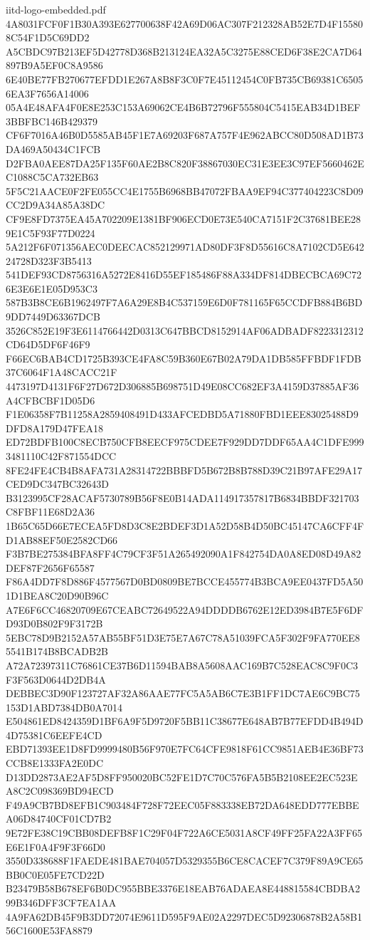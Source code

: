 \begin{filecontents*}[overwrite]{iitd-logo-embedded.pdf}
4A8031FCF0F1B30A393E627700638F42A69D06AC307F212328AB52E7D4F155808C54F1D5C69DD2
A5CBDC97B213EF5D42778D368B213124EA32A5C3275E88CED6F38E2CA7D64897B9A5EF0C8A9586
6E40BE77FB270677EFDD1E267A8B8F3C0F7E45112454C0FB735CB69381C65056EA3F7656A14006
05A4E48AFA4F0E8E253C153A69062CE4B6B72796F555804C5415EAB34D1BEF3BBFBC146B429379
CF6F7016A46B0D5585AB45F1E7A69203F687A757F4E962ABCC80D508AD1B73DA469A50434C1FCB
D2FBA0AEE87DA25F135F60AE2B8C820F38867030EC31E3EE3C97EF5660462EC1088C5CA732EB63
5F5C21AACE0F2FE055CC4E1755B6968BB47072FBAA9EF94C377404223C8D09CC2D9A34A85A38DC
CF9E8FD7375EA45A702209E1381BF906ECD0E73E540CA7151F2C37681BEE289E1C5F93F77D0224
5A212F6F071356AEC0DEECAC852129971AD80DF3F8D55616C8A7102CD5E64224728D323F3B5413
541DEF93CD8756316A5272E8416D55EF185486F88A334DF814DBECBCA69C726E3E6E1E05D953C3
587B3B8CE6B1962497F7A6A29E8B4C537159E6D0F781165F65CCDFB884B6BD9DD7449D63367DCB
3526C852E19F3E6114766442D0313C647BBCD8152914AF06ADBADF8223312312CD64D5DF6F46F9
F66EC6BAB4CD1725B393CE4FA8C59B360E67B02A79DA1DB585FFBDF1FDB37C6064F1A48CACC21F
4473197D4131F6F27D672D306885B698751D49E08CC682EF3A4159D37885AF36A4CFBCBF1D05D6
F1E06358F7B11258A2859408491D433AFCEDBD5A71880FBD1EEE83025488D9DFD8A179D47FEA18
ED72BDFB100C8ECB750CFB8EECF975CDEE7F929DD7DDF65AA4C1DFE9993481110C42F871554DCC
8FE24FE4CB4B8AFA731A28314722BBBFD5B672B8B788D39C21B97AFE29A17CED9DC347BC32643D
B3123995CF28ACAF5730789B56F8E0B14ADA114917357817B6834BBDF321703C8FBF11E68D2A36
1B65C65D66E7ECEA5FD8D3C8E2BDEF3D1A52D58B4D50BC45147CA6CFF4FD1AB88EF50E2582CD66
F3B7BE275384BFA8FF4C79CF3F51A265492090A1F842754DA0A8ED08D49A82DEF87F2656F65587
F86A4DD7F8D886F4577567D0BD0809BE7BCCE455774B3BCA9EE0437FD5A501D1BEA8C20D90B96C
A7E6F6CC46820709E67CEABC72649522A94DDDDB6762E12ED3984B7E5F6DFD93D0B802F9F3172B
5EBC78D9B2152A57AB55BF51D3E75E7A67C78A51039FCA5F302F9FA770EE85541B174B8BCADB2B
A72A72397311C76861CE37B6D11594BAB8A5608AAC169B7C528EAC8C9F0C3F3F563D0644D2DB4A
DEBBEC3D90F123727AF32A86AAE77FC5A5AB6C7E3B1FF1DC7AE6C9BC75153D1ABD7384DB0A7014
E504861ED8424359D1BF6A9F5D9720F5BB11C38677E648AB7B77EFDD4B494D4D75381C6EEFE4CD
EBD71393EE1D8FD9999480B56F970E7FC64CFE9818F61CC9851AEB4E36BF73CCB8E1333FA2E0DC
D13DD2873AE2AF5D8FF950020BC52FE1D7C70C576FA5B5B2108EE2EC523EA8C2C098369BD94ECD
F49A9CB7BD8EFB1C903484F728F72EEC05F883338EB72DA648EDD777EBBEA06D84740CF01CD7B2
9E72FE38C19CBB08DEFB8F1C29F04F722A6CE5031A8CF49FF25FA22A3FF65E6E1F0A4F9F3F66D0
3550D338688F1FAEDE481BAE704057D5329355B6CE8CACEF7C379F89A9CE65BB0C0E05FE7CD22D
B23479B58B678EF6B0DC955BBE3376E18EAB76ADAEA8E448815584CBDBA299B346DFF3CF7EA1AA
4A9FA62DB45F9B3DD72074E9611D595F9AE02A2297DEC5D92306878B2A58B156C1600E53FA8879

\end{filecontents*}
